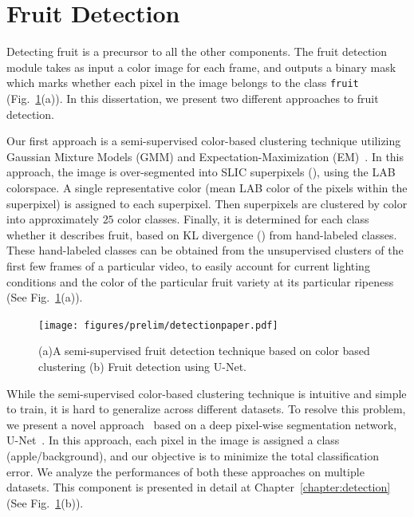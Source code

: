 %
\section{Fruit Detection}\label{subsec:syssegmentation}

Detecting fruit is a precursor to all the other components. The fruit detection module takes as input a color image for each frame, and outputs a binary mask which marks whether each pixel in the image belongs to the class \texttt{fruit} (Fig.~\ref{fig:detection_papers}(a)). In this dissertation, we present two different approaches to fruit detection. 

Our first approach is a semi-supervised color-based clustering technique utilizing Gaussian Mixture Models (GMM) and Expectation-Maximization (EM)~\cite{em}. In this approach, the image is over-segmented into SLIC superpixels (\cite{achanta2012slic}), using the LAB~\cite{connolly1997study} colorspace. A single representative color (mean LAB color of the pixels within the superpixel) is assigned to each superpixel. Then superpixels are clustered by color into approximately $25$ color classes. Finally, it is determined for each class whether it describes fruit, based on KL divergence (\cite{goldbergerKLdivergence}) from hand-labeled classes. These hand-labeled classes can be obtained from the unsupervised clusters of the first few frames of a particular video, to easily account for current lighting conditions and the color of the particular fruit variety at its particular ripeness (See Fig.~\ref{fig:detection_papers}(a)).


\begin{figure}[!hbpt]
    \centering
    \texttt{[image: figures/prelim/detectionpaper.pdf]}
    \caption[Developed fruit detection algorithms.]{ (a)A semi-supervised fruit detection technique based on color based clustering (b) Fruit detection using U-Net.}
    \label{fig:detection_papers}
\end{figure}

While the semi-supervised color-based clustering technique is intuitive and simple to train, it is hard to generalize across different datasets. To resolve this problem, we present a novel approach~\cite{hani_jfr_counting} based on a deep pixel-wise segmentation network, U-Net~\cite{ronneberger_u-net:_2015}. In this approach, each pixel in the image is assigned a class (apple/background), and our objective is to minimize the total classification error. We analyze the performances of both these approaches on multiple datasets. This component is presented in detail at Chapter~\ref{chapter:detection} (See Fig.~\ref{fig:detection_papers}(b)). 

